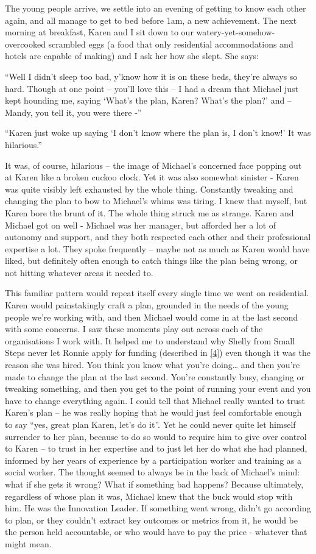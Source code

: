 The young people arrive, we settle into an evening of getting to know each other again, and all manage to get to bed before 1am, a new achievement. The next morning at breakfast, Karen and I sit down to our watery-yet-somehow-overcooked scrambled eggs (a food that only residential accommodations and hotels are capable of making) and I ask her how she slept. She says:

“Well I didn’t sleep too bad, y’know how it is on these beds, they’re always so hard. Though at one point – you’ll love this – I had a dream that Michael just kept hounding me, saying ‘What’s the plan, Karen? What’s the plan?’ and – Mandy, you tell it, you were there -”

“Karen just woke up saying ‘I don’t know where the plan is, I don’t know!’ It was hilarious.”

It was, of course, hilarious – the image of Michael’s concerned face popping out at Karen like a broken cuckoo clock. Yet it was also somewhat sinister - Karen was quite visibly left exhausted by the whole thing. Constantly tweaking and changing the plan to bow to Michael’s whims was tiring. I knew that myself, but Karen bore the brunt of it. The whole thing struck me as strange. Karen and Michael got on well - Michael was her manager, but afforded her a lot of autonomy and support, and they both respected each other and their professional expertise a lot. They spoke frequently – maybe not as much as Karen would have liked, but definitely often enough to catch things like the plan being wrong, or not hitting whatever areas it needed to. 

This familiar pattern would repeat itself every single time we went on residential. Karen would painstakingly craft a plan, grounded in the needs of the young people we’re working with, and then Michael would come in at the last second with some concerns. I saw these moments play out across each of the organisations I work with. It helped me to understand why Shelly from Small Steps never let Ronnie apply for funding (described in \ref{4}) even though it was the reason she was hired.  You think you know what you’re doing… and then you’re made to change the plan at the last second. You’re constantly busy, changing or tweaking something, and then you get to the point of running your event and you have to change everything again. I could tell that Michael really wanted to trust Karen’s plan – he was really hoping that he would just feel comfortable enough to say “yes, great plan Karen, let’s do it”. Yet he could never quite let himself surrender to her plan, because to do so would to require him to give over control to Karen – to trust in her expertise and to just let her do what she had planned, informed by her years of experience by a participation worker and training as a social worker. The thought seemed to always be in the back of Michael’s mind: what if she gets it wrong? What if something bad happens? Because ultimately, regardless of whose plan it was, Michael knew that the buck would stop with him. He was the Innovation Leader.  If something went wrong, didn’t go according to plan, or they couldn’t extract key outcomes or metrics from it, he would be the person held accountable, or who would have to pay the price - whatever that might mean. 

